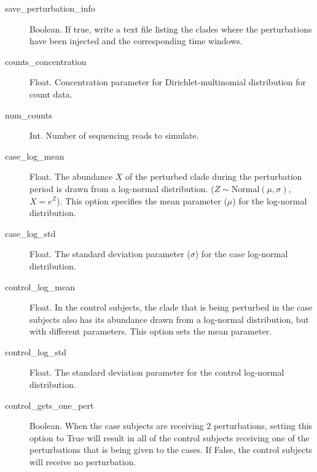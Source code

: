 \documentclass[12pt]{report}
\begin{document}
\begin{description}
\item[save\_perturbation\_info ] Boolean. If true, write a text file
  listing the clades where the perturbations have been injected and
  the corresponding time windows.
\item[counts\_concentration ] Float. Concentration parameter for
  Dirichlet-multinomial distribution for count data.
\item[num\_counts ] Int. Number of sequencing reads to simulate.
\item[case\_log\_mean] Float. The abundance $X$ of the perturbed clade during the perturbation period is drawn from a log-normal distribution. ($Z \sim \text{Normal}(\mu, \sigma)$, $X = e^Z$). This option specifies the mean parameter ($\mu$) for the log-normal distribution.
\item[case\_log\_std] Float. The standard deviation parameter ($\sigma$) for the case log-normal distribution.
\item[control\_log\_mean] Float. In the control subjects, the clade that is being perturbed in the case subjects also has its abundance drawn from a log-normal distribution, but with different parameters. This option sets the mean parameter.
\item[control\_log\_std] Float. The standard deviation parameter for the control log-normal distribution.
\item[control\_gets\_one\_pert] Boolean. When the case subjects are receiving 2 perturbations, setting this option to True will result in all of the control subjects receiving one of the perturbations that is being given to the cases. If False, the control subjects will receive no perturbation.
\end{description}
\end{document}
